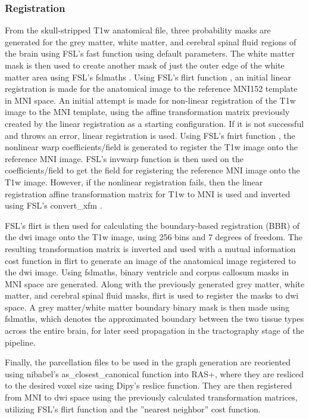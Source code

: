 \subsubsection{Registration}
From the skull-stripped T1w anatomical file, three probability masks are generated for the grey matter, white matter, and cerebral spinal fluid regions of the brain using FSL's fast function \cite{fsl1, fsl2, fsl3} using default parameters. The white matter mask is then used to create another mask of just the outer edge of the white matter area using FSL's fslmaths \cite{fsl1, fsl2, fsl3}. Using FSL's flirt function \cite{fsl1, fsl2, fsl3}, an initial linear registration is made for the anatomical image to the reference MNI152 template in MNI space. An initial attempt is made for non-linear registration of the T1w image to the MNI template, using the affine transformation matrix previously created by the linear registration as a starting configuration. If it is not successful and throws an error, linear registration is used. Using FSL's fnirt function \cite{fsl1, fsl2, fsl3}, the nonlinear warp coefficients/field is generated to register the T1w image onto the reference MNI image. FSL's invwarp function \cite{fsl1, fsl2, fsl3} is then used on the coefficients/field to get the field for registering the reference MNI image onto the T1w image. However, if the nonlinear registration fails, then the linear registration affine transformation matrix for T1w to MNI is used and inverted using FSL's convert\_xfm \cite{fsl1, fsl2, fsl3}.

FSL's flirt is then used for calculating the boundary-based registration (BBR) of the dwi image onto the T1w image, using 256 bins and 7 degrees of freedom. The resulting transformation matrix is inverted and used with a mutual information cost function in flirt to generate an image of the anatomical image registered to the dwi image. Using fslmaths, binary ventricle and corpus callosum masks in MNI space are generated. Along with the previously generated grey matter, white matter, and cerebral spinal fluid masks, flirt is used to register the masks to dwi space. A grey matter/white matter boundary binary mask is then made using fslmaths, which denotes the approximated boundary between the two tissue types across the entire brain, for later seed propagation in the tractography stage of the pipeline.

Finally, the parcellation files to be used in the graph generation are reoriented using nibabel's as\_closest\_canonical function into RAS+, where they are resliced to the desired voxel size using Dipy's reslice function. They are then registered from MNI to dwi space using the previously calculated transformation matrices, utilizing FSL's flirt function and the ''nearest neighbor'' cost function.

